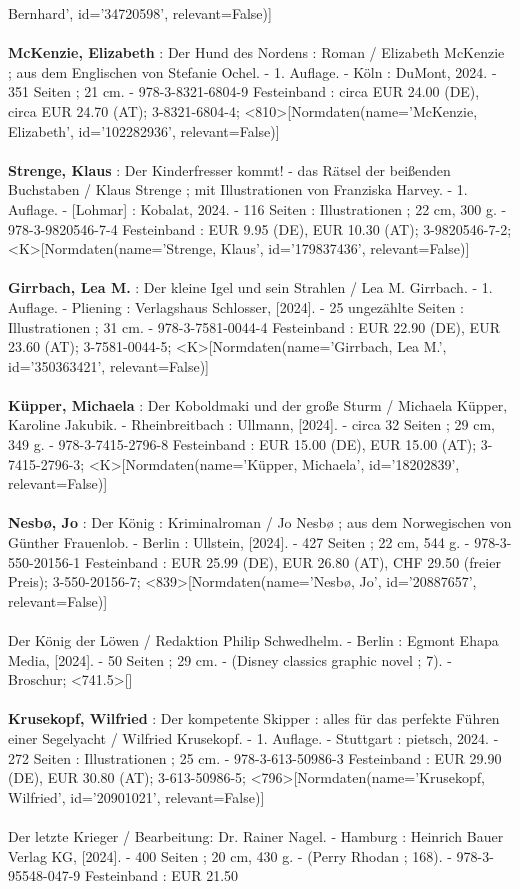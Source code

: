 \documentclass{article}
\begin{document}
\begin{multicols}{3}
Bernhard', id='34720598', relevant=False)]\\\\\textbf{McKenzie, Elizabeth} : Der Hund des Nordens : Roman / Elizabeth McKenzie ; aus dem Englischen von Stefanie Ochel. - 1. Auflage. - Köln : DuMont, 2024. - 351 Seiten ; 21 cm. - 978-3-8321-6804-9 Festeinband : circa EUR 24.00 (DE), circa EUR 24.70 (AT); 3-8321-6804-4; <810>[Normdaten(name='McKenzie, Elizabeth', id='102282936', relevant=False)]\\\\\textbf{Strenge, Klaus} : Der Kinderfresser kommt! - das Rätsel der beißenden Buchstaben / Klaus Strenge ; mit Illustrationen von Franziska Harvey. - 1. Auflage. - [Lohmar] : Kobalat, 2024. - 116 Seiten : Illustrationen ; 22 cm, 300 g. - 978-3-9820546-7-4 Festeinband : EUR 9.95 (DE), EUR 10.30 (AT); 3-9820546-7-2; <K>[Normdaten(name='Strenge, Klaus', id='179837436', relevant=False)]\\\\\textbf{Girrbach, Lea M.} : Der kleine Igel und sein Strahlen / Lea M. Girrbach. - 1. Auflage. - Pliening : Verlagshaus Schlosser, [2024]. - 25 ungezählte Seiten : Illustrationen ; 31 cm. - 978-3-7581-0044-4 Festeinband : EUR 22.90 (DE), EUR 23.60 (AT); 3-7581-0044-5; <K>[Normdaten(name='Girrbach, Lea M.', id='350363421', relevant=False)]\\\\\textbf{Küpper, Michaela} : Der Koboldmaki und der große Sturm / Michaela Küpper, Karoline Jakubik. - Rheinbreitbach : Ullmann, [2024]. - circa 32 Seiten ; 29 cm, 349 g. - 978-3-7415-2796-8 Festeinband : EUR 15.00 (DE), EUR 15.00 (AT); 3-7415-2796-3; <K>[Normdaten(name='Küpper, Michaela', id='18202839', relevant=False)]\\\\\textbf{Nesbø, Jo} : Der König : Kriminalroman / Jo Nesbø ; aus dem Norwegischen von Günther Frauenlob. - Berlin : Ullstein, [2024]. - 427 Seiten ; 22 cm, 544 g. - 978-3-550-20156-1 Festeinband : EUR 25.99 (DE), EUR 26.80 (AT), CHF 29.50 (freier Preis); 3-550-20156-7; <839>[Normdaten(name='Nesbø, Jo', id='20887657', relevant=False)]\\\\Der König der Löwen / Redaktion Philip Schwedhelm. - Berlin : Egmont Ehapa Media, [2024]. - 50 Seiten ; 29 cm. - (Disney classics graphic novel ; 7). - Broschur; <741.5>[]\\\\\textbf{Krusekopf, Wilfried} : Der kompetente Skipper : alles für das perfekte Führen einer Segelyacht / Wilfried Krusekopf. - 1. Auflage. - Stuttgart : pietsch, 2024. - 272 Seiten : Illustrationen ; 25 cm. - 978-3-613-50986-3 Festeinband : EUR 29.90 (DE), EUR 30.80 (AT); 3-613-50986-5; <796>[Normdaten(name='Krusekopf, Wilfried', id='20901021', relevant=False)]\\\\Der letzte Krieger / Bearbeitung: Dr. Rainer Nagel. - Hamburg : Heinrich Bauer Verlag KG, [2024]. - 400 Seiten ; 20 cm, 430 g. - (Perry Rhodan ; 168). - 978-3-95548-047-9 Festeinband : EUR 21.50 
\end{multicols}
\end{document}

